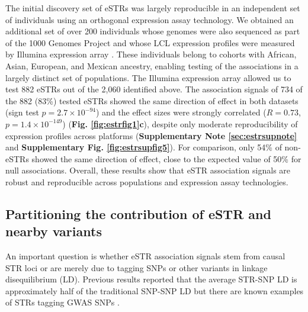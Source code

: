 The initial discovery set of eSTRs was largely reproducible in an independent set of individuals using an orthogonal expression assay technology. We obtained an additional set of over 200 individuals whose genomes were also sequenced as part of the 1000 Genomes Project and whose LCL expression profiles were measured by Illumina expression array \cite{StrangerMontgomeryDimasEtAl2012}. These individuals belong to cohorts with African, Asian, European, and Mexican ancestry, enabling testing of the associations in a largely distinct set of populations. The Illumina expression array allowed us to test 882 eSTRs out of the 2,060 identified above. The association signals of 734 of the 882 (83\%) tested eSTRs showed the same direction of effect in both datasets (sign test $p=2.7 \times 10^{-94}$) and the effect sizes were strongly correlated ($R=0.73$, $p=1.4 \times 10^{-149}$) (\textbf{Fig. \ref{fig:estrfig1}c}), despite only moderate reproducibility of expression profiles across platforms (\textbf{Supplementary Note \ref{sec:estrsupnote}} and \textbf{Supplementary Fig. \ref{fig:estrsupfig5}}). For comparison, only 54\% of non-eSTRs showed the same direction of effect, close to the expected value of 50\% for null associations. Overall, these results show that eSTR association signals are robust and reproducible across populations and expression assay technologies. 

\subsection{Partitioning the contribution of eSTR and nearby variants}
An important question is whether eSTR association signals stem from causal STR loci or are merely due to tagging SNPs or other variants in linkage disequilibrium (LD). Previous results reported that the average STR-SNP LD is approximately half of the traditional SNP-SNP LD \cite{PayseurPlaceWeber2008,WillemsGymrekHighnamEtAl2014} but there are known examples of STRs tagging GWAS SNPs \cite{LaminaHaunCoassinEtAl2014}.

